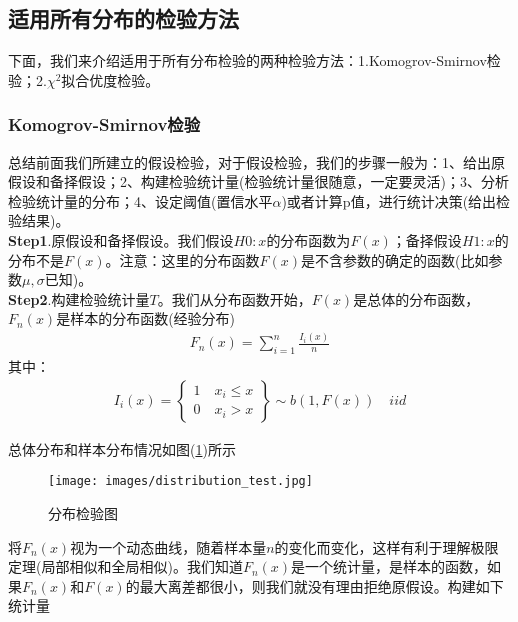     \subsection{适用所有分布的检验方法}
        \par
        下面，我们来介绍适用于所有分布检验的两种检验方法：1.Komogrov-Smirnov检验；2.$\chi^2$拟合优度检验。
        \subsubsection{Komogrov-Smirnov检验}
            总结前面我们所建立的假设检验，对于假设检验，我们的步骤一般为：1、给出原假设和备择假设；2、构建检验统计量(检验统计量很随意，一定要灵活)；3、分析检验统计量的分布；4、设定阈值(置信水平$\alpha$)或者计算p值，进行统计决策(给出检验结果)。\\
            \textbf{Step1}.原假设和备择假设。我们假设$H0:x$的分布函数为$F(x)$；备择假设$H1:x$的分布不是$F(x)$。注意：这里的分布函数$F(x)$是不含参数的确定的函数(比如参数$\mu,\sigma$已知)。\\
            \textbf{Step2}.构建检验统计量$T$。我们从分布函数开始，$F(x)$是总体的分布函数，$F_n(x)$是样本的分布函数(经验分布)
            \begin{align*}
            F_n(x) = \sum_{i=1}^n \frac{I_i(x)}{n}
            \end{align*}
            其中：
            \begin{align*}
            I_i(x) =
            \left\{
              \begin{aligned}
              1\quad x_i  \leqslant x\\
              0\quad x_i > x
              \end{aligned}
            \right\}
            \sim b(1,F(x)) \quad iid
            \end{align*}
            \par
            总体分布和样本分布情况如图(\ref{fig:分布检验图})所示
            \begin{figure}[H]
            \centering
            \texttt{[image: images/distribution\_test.jpg]}
            \caption{分布检验图}
            \label{fig:分布检验图}
            \end{figure}
            将$F_n(x)$视为一个动态曲线，随着样本量$n$的变化而变化，这样有利于理解极限定理(局部相似和全局相似)。我们知道$F_n(x)$是一个统计量，是样本的函数，如果$F_n(x)$和$F(x)$的最大离差都很小，则我们就没有理由拒绝原假设。构建如下统计量
